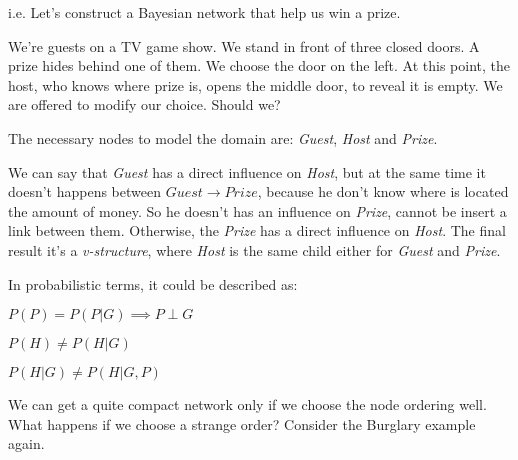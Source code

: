 \begin{example}
    i.e. Let's construct a Bayesian network that help us win a prize. \vspace{3.5pt}

    We're guests on a TV game show. We stand in front of three closed doors. A prize hides behind one of them. We choose the door on the left. At this point, the host,
    who knows where prize is, opens the middle door, to reveal it is empty. We are offered to modify our choice. Should we? \vspace{7pt}

    The necessary nodes to model the domain are: \textit{Guest}, \textit{Host} and \textit{Prize}. \vspace{3.5pt}

    We can say that \textit{Guest} has a direct influence on \textit{Host}, but at the same time it doesn't happens between \textit{$Guest \rightarrow Prize$},
    because he don't know where is located the amount of money. So he doesn't has an influence on \textit{Prize}, cannot be insert a link between them. Otherwise, the \textit{Prize}
    has a direct influence on \textit{Host}. The final result it's a \textit{v-structure}, where \textit{Host} is the same child either for \textit{Guest} and \textit{Prize}. \vspace{3.5pt}
    
    In probabilistic terms, it could be described as: \vspace{3.5pt}
    
    $P(P) = P(P|G) \implies P \perp G$

    $P(H) \neq P(H|G)$

    $P(H|G) \neq P(H|G, P)$
\end{example}
We can get a quite compact network only if we choose the node ordering well. What happens if we choose a strange order? Consider the Burglary example again.
